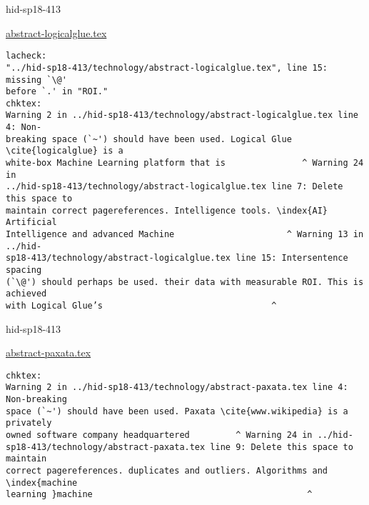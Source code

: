 \begin{IU}

hid-sp18-413

\href{https://github.com/cloudmesh-community/hid-sp18-413/blob/master//technology/abstract-logicalglue.tex}{abstract-logicalglue.tex}

\begin{tiny}
\begin{verbatim}
lacheck:
"../hid-sp18-413/technology/abstract-logicalglue.tex", line 15: missing `\@'
before `.' in "ROI."
chktex:
Warning 2 in ../hid-sp18-413/technology/abstract-logicalglue.tex line 4: Non-
breaking space (`~') should have been used. Logical Glue \cite{logicalglue} is a
white-box Machine Learning platform that is               ^ Warning 24 in
../hid-sp18-413/technology/abstract-logicalglue.tex line 7: Delete this space to
maintain correct pagereferences. Intelligence tools. \index{AI} Artificial
Intelligence and advanced Machine                      ^ Warning 13 in ../hid-
sp18-413/technology/abstract-logicalglue.tex line 15: Intersentence spacing
(`\@') should perhaps be used. their data with measurable ROI. This is achieved
with Logical Glue’s                                 ^
\end{verbatim}
\end{tiny}
\end{IU}



\begin{IU}

hid-sp18-413

\href{https://github.com/cloudmesh-community/hid-sp18-413/blob/master//technology/abstract-paxata.tex}{abstract-paxata.tex}

\begin{tiny}
\begin{verbatim}
chktex:
Warning 2 in ../hid-sp18-413/technology/abstract-paxata.tex line 4: Non-breaking
space (`~') should have been used. Paxata \cite{www.wikipedia} is a privately
owned software company headquartered         ^ Warning 24 in ../hid-
sp18-413/technology/abstract-paxata.tex line 9: Delete this space to maintain
correct pagereferences. duplicates and outliers. Algorithms and \index{machine
learning }machine                                          ^
\end{verbatim}
\end{tiny}
\end{IU}



